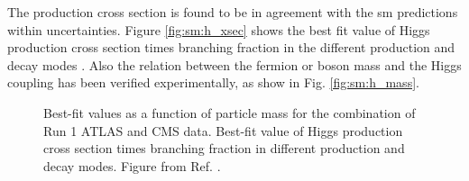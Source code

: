 The production cross section is found to be in agreement with the \gls{sm} predictions within uncertainties. Figure \ref{fig:sm:h_xsec} shows the best fit value of Higgs production cross section times branching fraction in the different production and decay modes \cite{Khachatryan:2016vau}. Also the relation between the fermion or boson mass and the Higgs coupling has been verified experimentally, as show in Fig. \ref{fig:sm:h_mass}. 

\begin{figure}[ht]
\centering
{}
\caption{ Best-fit values as a function of particle mass for the combination of Run 1 ATLAS and CMS data.  Best-fit value of Higgs production cross section times branching fraction in different production and decay modes. Figure from Ref.  \cite{Khachatryan:2016vau}.}
\label{fig:sm:h_couplings_mass}
\end{figure}

 


